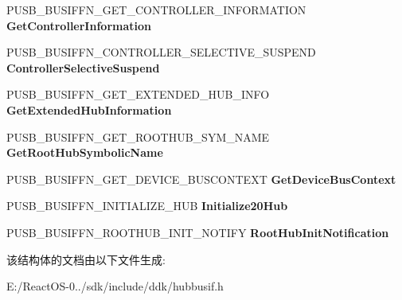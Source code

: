 \begin{DoxyCompactItemize}
P\+U\+S\+B\+\_\+\+B\+U\+S\+I\+F\+F\+N\+\_\+\+G\+E\+T\+\_\+\+C\+O\+N\+T\+R\+O\+L\+L\+E\+R\+\_\+\+I\+N\+F\+O\+R\+M\+A\+T\+I\+ON {\bfseries Get\+Controller\+Information}
\item 
\mbox{\label{struct___u_s_b___b_u_s___i_n_t_e_r_f_a_c_e___h_u_b___v3_a71803a0edb1d0746b86c06b02af06786}} 
P\+U\+S\+B\+\_\+\+B\+U\+S\+I\+F\+F\+N\+\_\+\+C\+O\+N\+T\+R\+O\+L\+L\+E\+R\+\_\+\+S\+E\+L\+E\+C\+T\+I\+V\+E\+\_\+\+S\+U\+S\+P\+E\+ND {\bfseries Controller\+Selective\+Suspend}
\item 
\mbox{\label{struct___u_s_b___b_u_s___i_n_t_e_r_f_a_c_e___h_u_b___v3_ad6b0bb67ce14de1ead10a8ab7604b910}} 
P\+U\+S\+B\+\_\+\+B\+U\+S\+I\+F\+F\+N\+\_\+\+G\+E\+T\+\_\+\+E\+X\+T\+E\+N\+D\+E\+D\+\_\+\+H\+U\+B\+\_\+\+I\+N\+FO {\bfseries Get\+Extended\+Hub\+Information}
\item 
\mbox{\label{struct___u_s_b___b_u_s___i_n_t_e_r_f_a_c_e___h_u_b___v3_a93a15b71e2f26cc5817b06ce518d7b56}} 
P\+U\+S\+B\+\_\+\+B\+U\+S\+I\+F\+F\+N\+\_\+\+G\+E\+T\+\_\+\+R\+O\+O\+T\+H\+U\+B\+\_\+\+S\+Y\+M\+\_\+\+N\+A\+ME {\bfseries Get\+Root\+Hub\+Symbolic\+Name}
\item 
\mbox{\label{struct___u_s_b___b_u_s___i_n_t_e_r_f_a_c_e___h_u_b___v3_ad8677ad5ee3ff766cfbf28fd2368b301}} 
P\+U\+S\+B\+\_\+\+B\+U\+S\+I\+F\+F\+N\+\_\+\+G\+E\+T\+\_\+\+D\+E\+V\+I\+C\+E\+\_\+\+B\+U\+S\+C\+O\+N\+T\+E\+XT {\bfseries Get\+Device\+Bus\+Context}
\item 
\mbox{\label{struct___u_s_b___b_u_s___i_n_t_e_r_f_a_c_e___h_u_b___v3_a43ad24abffdcf6202c0d49d3ef548403}} 
P\+U\+S\+B\+\_\+\+B\+U\+S\+I\+F\+F\+N\+\_\+\+I\+N\+I\+T\+I\+A\+L\+I\+Z\+E\+\_\+H\+UB {\bfseries Initialize20\+Hub}
\item 
\mbox{\label{struct___u_s_b___b_u_s___i_n_t_e_r_f_a_c_e___h_u_b___v3_a78c9e416f301a2318a155dc8cfc0f6da}} 
P\+U\+S\+B\+\_\+\+B\+U\+S\+I\+F\+F\+N\+\_\+\+R\+O\+O\+T\+H\+U\+B\+\_\+\+I\+N\+I\+T\+\_\+\+N\+O\+T\+I\+FY {\bfseries Root\+Hub\+Init\+Notification}
\end{DoxyCompactItemize}


该结构体的文档由以下文件生成\+:\begin{DoxyCompactItemize}
\item 
E\+:/\+React\+O\+S-\/0../sdk/include/ddk/hubbusif.\+h\end{DoxyCompactItemize}
